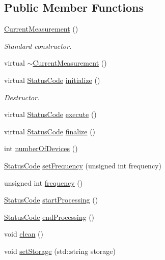 \subsection*{Public Member Functions}
\begin{DoxyCompactItemize}
\item 
\hyperlink{classCurrentMeasurement_ad89184bc1f2386b71051d7976ec662f1}{CurrentMeasurement} ()
\begin{DoxyCompactList}\small\item\em Standard constructor. \item\end{DoxyCompactList}\item 
virtual \hyperlink{classCurrentMeasurement_a86c291508b913b4b028567eeb8995c83}{$\sim$CurrentMeasurement} ()
\item 
virtual \hyperlink{classStatusCode}{StatusCode} \hyperlink{classCurrentMeasurement_a88d397682cb5847d5710d08544b6f4c6}{initialize} ()
\begin{DoxyCompactList}\small\item\em Destructor. \item\end{DoxyCompactList}\item 
virtual \hyperlink{classStatusCode}{StatusCode} \hyperlink{classCurrentMeasurement_a19ae0dcc63b4151ceebe0bf2c42da948}{execute} ()
\item 
virtual \hyperlink{classStatusCode}{StatusCode} \hyperlink{classCurrentMeasurement_af87fa329a11212c10e878568bcecaeb3}{finalize} ()
\item 
int \hyperlink{classCurrentMeasurement_a646a9953d7aef3bad2e2dacaab31c241}{numberOfDevices} ()
\item 
\hyperlink{classStatusCode}{StatusCode} \hyperlink{classCurrentMeasurement_ae990f376398bc25891eaddcb245fdf46}{setFrequency} (unsigned int frequency)
\item 
unsigned int \hyperlink{classCurrentMeasurement_ae7c60d0b14808000df5f1d633e0ca990}{frequency} ()
\item 
\hyperlink{classStatusCode}{StatusCode} \hyperlink{classProcessus_a09319bde9bed93e290f69b4e04585543}{startProcessing} ()
\item 
\hyperlink{classStatusCode}{StatusCode} \hyperlink{classProcessus_a5e4da662989d356b89d490b89c7afbfd}{endProcessing} ()
\item 
void \hyperlink{classProcessus_aaeb17673b98d2b39f3aa780e335e0968}{clean} ()
\item 
void \hyperlink{classProcessus_ad57a29b33f9021eda9f6929136f1784f}{setStorage} (std::string storage)

\end{DoxyCompactItemize}
